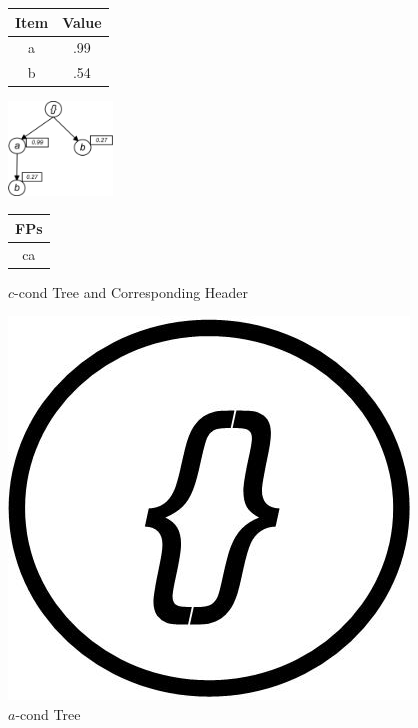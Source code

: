 \begin{figure}
\begin{minipage}{0.15\textwidth}
  \centering
	\begin{center}
	\begin{tabular}{ |c|c| } 
 	\hline
 		Item&Value\\ \hline\hline
 		a &  .99  	\\ \hline
 		b &  .54   	\\ \hline
\end{tabular}
\end{center}  
\end{minipage}
  \hfill
\begin{minipage}{0.14\textwidth}
  \centering
  \hfill
  \includegraphics[width=.8\textwidth, height=2.5cm]{images/C_COND.jpg}
  \hfill  
\end{minipage}
\hfill
\begin{minipage}{0.15\textwidth}
  \centering  
	\begin{center}
	\begin{tabular}{ |c| } 
 	\hline
 		FPs \\ \hline\hline
 		ca  	\\ \hline
 		
\end{tabular}
\end{center}   
\end{minipage}
\caption{$c$-cond Tree and Corresponding Header}
\label{figure:c_cond}
\end{figure}







\begin{figure}
\centering
  \includegraphics[width=.05\textwidth]{images/A_COND.jpg}
\caption{$a$-cond Tree}
\label{figure:a_cond}
\end{figure}

%

